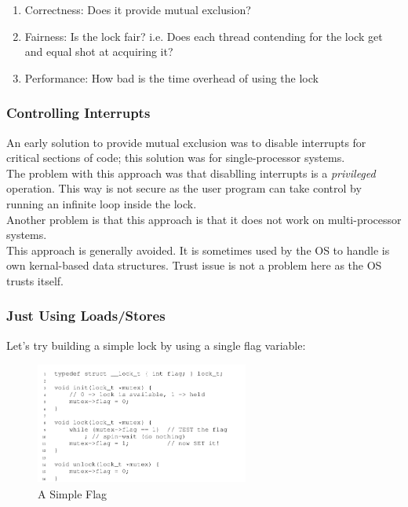 \begin{enumerate}
    \item Correctness: Does it provide mutual exclusion?
    \item Fairness: Is the lock fair? i.e. Does each thread contending for the lock get
        and equal shot at acquiring it?
    \item Performance: How bad is the time overhead of using the lock
\end{enumerate}

\subsubsection{Controlling Interrupts}

An early solution to provide mutual exclusion was to disable interrupts for
critical sections of code; this solution was for single-processor systems.\\

The problem with this approach was that disablling interrupts is a \textit{privileged}
operation. This way is not secure as the user program can take control by
running an infinite loop inside the lock.\\

Another problem is that this approach is that it does not work on multi-processor
systems.\\

This approach is generally avoided. It is sometimes used by the OS to handle
is own kernal-based data structures. Trust issue is not a problem here as
the OS trusts itself.

\subsubsection{Just Using Loads/Stores}

Let's try building a simple lock by using a single flag variable:

\begin{figure}[h!]
    \begin{center}
        \includegraphics[width=7cm, height=4cm]{img/281.png}
        \caption{A Simple Flag}
    \end{center}
\end{figure}

